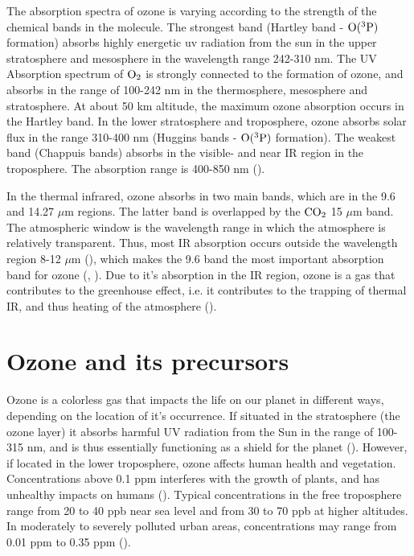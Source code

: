 \medskip

The absorption spectra of ozone is varying according to the strength of the chemical bands in the molecule. The strongest band (Hartley band - $\mathrm{O(^3P)}$ formation) absorbs highly energetic \acrfull{uv} radiation from the sun in the upper stratosphere and mesosphere in the wavelength range 242-310 nm. The UV Absorption spectrum of $\mathrm{O_2}$ is strongly connected to the formation of ozone, and absorbs in the range of 100-242 nm in the thermosphere, mesosphere and stratosphere. At about 50 km altitude, the maximum ozone absorption occurs in the Hartley band. In the lower stratosphere and troposphere, ozone absorbs solar flux in the range 310-400 nm (Huggins bands - $\mathrm{O(^3P)}$ formation). The weakest band (Chappuis bands) absorbs in the visible- and near IR region in the troposphere. The absorption range is 400-850 nm (\cite{Liou_AtmRad}). 



\medskip 

In the thermal infrared, ozone absorbs in two main bands, which are in the 9.6 and 14.27 $\mu$m regions. The latter band is overlapped by the $\mathrm{CO_2}$ 15 $\mu$m band. The atmospheric window is the wavelength range in which the atmosphere is relatively transparent. Thus, most IR absorption occurs outside the wavelength region 8-12 $\mu$m (\cite{AtmModFund}), which makes the 9.6 band the most important absorption band for ozone (\cite{Liou_AtmRad}, \cite{Myhre1997}). Due to it's absorption in the IR region, ozone is a gas that contributes to the greenhouse effect, i.e. it contributes to the trapping of thermal IR, and thus heating of the atmosphere (\cite{Liou_AtmRad}).



\section{Ozone and its precursors}

Ozone is a colorless gas that impacts the life on our planet in different ways, depending on the location of it's occurrence. If situated in the stratosphere (the ozone layer) it absorbs harmful UV radiation from the Sun in the range of 100-315 nm, and is thus essentially functioning as a shield for the planet (\cite{SeinfeldSpyros}). However, if located in the lower troposphere, ozone affects human health and vegetation. Concentrations above 0.1 \acrfull{ppm} interferes with the growth of plants, and has unhealthy impacts on humans (\cite{AtmModFund}). Typical concentrations in the free troposphere range from 20 to 40 \acrfull{ppb} near sea level and from 30 to 70 ppb at higher altitudes. In moderately to severely polluted urban areas, concentrations may range from 0.01 ppm to 0.35 ppm (\cite{AtmModFund}).  


